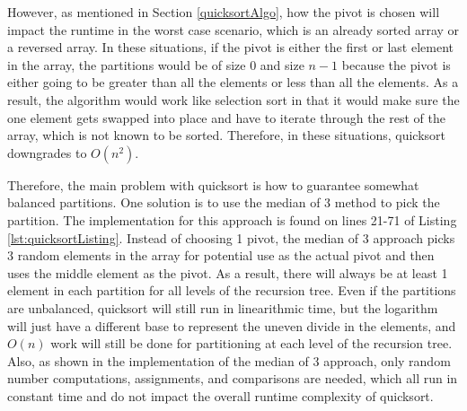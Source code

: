\documentclass[letterpaper, 10pt,DIV=13]{scrartcl}
\numberwithin{equation}{section} %
\numberwithin{figure}{section} %
\numberwithin{table}{section} %
\begin{document}
However, as mentioned in Section \ref{quicksortAlgo}, how the pivot is chosen will impact the runtime in the worst case scenario, which is an already sorted array or a reversed array. In these situations, if the pivot is either the first or last element in the array, the partitions would be of size 0 and size $n - 1$ because the pivot is either going to be greater than all the elements or less than all the elements. As a result, the algorithm would work like selection sort in that it would make sure the one element gets swapped into place and have to iterate through the rest of the array, which is not known to be sorted. Therefore, in these situations, quicksort downgrades to $O(n^2)$.

Therefore, the main problem with quicksort is how to guarantee somewhat balanced partitions. One solution is to use the median of 3 method to pick the partition. The implementation for this approach is found on lines 21-71 of Listing \ref{lst:quicksortListing}. Instead of choosing 1 pivot, the median of 3 approach picks 3 random elements in the array for potential use as the actual pivot and then uses the middle element as the pivot. As a result, there will always be at least 1 element in each partition for all levels of the recursion tree. Even if the partitions are unbalanced, quicksort will still run in linearithmic time, but the logarithm will just have a different base to represent the uneven divide in the elements, and $O(n)$ work will still be done for partitioning at each level of the recursion tree. Also, as shown in the implementation of the median of 3 approach, only random number computations, assignments, and comparisons are needed, which all run in constant time and do not impact the overall runtime complexity of quicksort.
\end{document}

